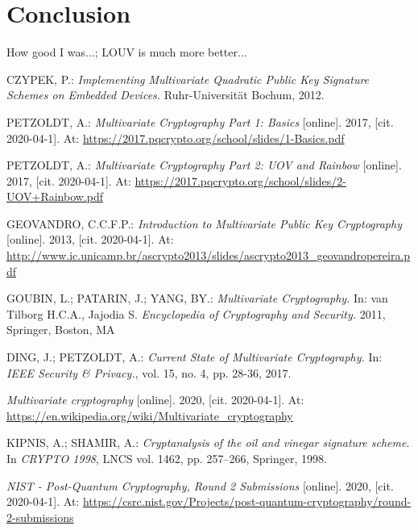 \documentclass[thesis=M,english]{FITthesis}[2019/12/23]
\begin{document}
\chapter{Conclusion}
How good I was...; LOUV is much more better...




\begin{thebibliography}{9}
CZYPEK, P.: \textit{Implementing Multivariate Quadratic Public Key Signature Schemes on
Embedded Devices.}  Ruhr-Universit\"{a}t Bochum, 2012.

PETZOLDT, A.: \textit{Multivariate Cryptography Part 1: Basics} [online]. 2017, [cit. 2020-04-1]. At: \url{https://2017.pqcrypto.org/school/slides/1-Basics.pdf}

PETZOLDT, A.: \textit{Multivariate Cryptography Part 2: UOV and Rainbow} [online]. 2017, [cit. 2020-04-1]. At: \url{https://2017.pqcrypto.org/school/slides/2-UOV+Rainbow.pdf}

GEOVANDRO, C.C.F.P.: \textit{Introduction to Multivariate Public Key Cryptography} [online]. 2013, [cit. 2020-04-1]. At: \url{http://www.ic.unicamp.br/ascrypto2013/slides/ascrypto2013_geovandropereira.pdf}

GOUBIN, L.; PATARIN, J.; YANG, BY.: \textit{Multivariate Cryptography.} In: van Tilborg H.C.A., Jajodia S. \textit{Encyclopedia of Cryptography and Security.} 2011, Springer, Boston, MA

DING, J.; PETZOLDT, A.: \textit{Current State of Multivariate Cryptography.} In: \textit{IEEE Security \& Privacy.}, vol. 15, no. 4, pp. 28-36, 2017.

\textit{Multivariate cryptography} [online]. 2020, [cit. 2020-04-1]. At: \url{https://en.wikipedia.org/wiki/Multivariate_cryptography}

KIPNIS, A.; SHAMIR, A.: \textit{Cryptanalysis of the oil and vinegar signature scheme}. In \textit{CRYPTO 1998}, LNCS vol. 1462, pp. 257–266, Springer, 1998.

\textit{NIST - Post-Quantum Cryptography, Round 2 Submissions} [online]. 2020, [cit. 2020-04-1]. At: \url{https://csrc.nist.gov/Projects/post-quantum-cryptography/round-2-submissions}


\end{thebibliography}
\end{document}
